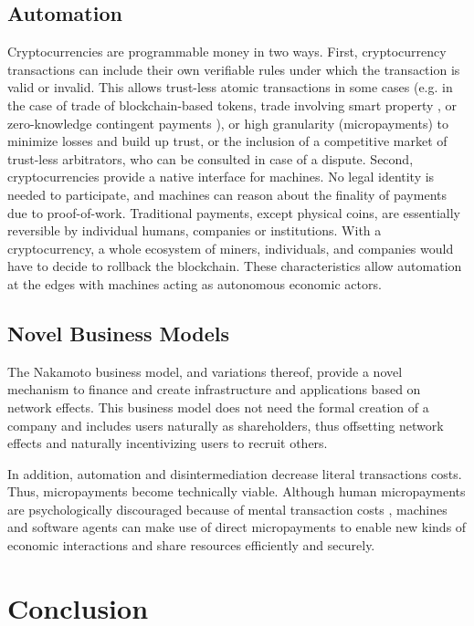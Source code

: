 \subsection{Automation}

Cryptocurrencies are programmable money in two ways. First, cryptocurrency transactions can include their own verifiable rules under which the transaction is valid or invalid. This allows trust-less atomic transactions in some cases (e.g. in the case of trade of blockchain-based tokens, trade involving smart property \parencite{smartcontr}, or zero-knowledge contingent payments \parencite{maxwell2016zk}), or high granularity (micropayments) to minimize losses and build up trust, or the inclusion of a competitive market of trust-less arbitrators, who can be consulted in case of a dispute. Second, cryptocurrencies provide a native interface for machines. No legal identity is needed to participate, and machines can reason about the finality of payments due to proof-of-work. Traditional payments, except physical coins, are essentially reversible by individual humans, companies or institutions. With a cryptocurrency, a whole ecosystem of miners, individuals, and companies would have to decide to rollback the blockchain. These characteristics allow automation at the edges with machines acting as autonomous economic actors.

\subsection{Novel Business Models}

The Nakamoto business model, and variations thereof, provide a novel mechanism to finance and create infrastructure and applications based on network effects. This business model does not need the formal creation of a company and includes users naturally as shareholders, thus offsetting network effects and naturally incentivizing users to recruit others.

In addition, automation and disintermediation decrease literal transactions costs. Thus, micropayments become technically viable. Although human micropayments are psychologically discouraged because of mental transaction costs \parencite{szabo1999micropayments}, machines and software agents can make use of direct micropayments to enable new kinds of economic interactions and share resources efficiently and securely. 


\section{Conclusion}

